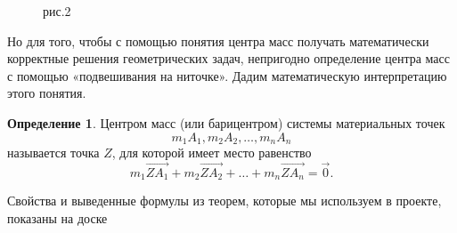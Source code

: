 \documentclass[a4paper,12pt]{article}
\theoremstyle{plain} %
\numberwithin{equation}{section}
\theoremstyle{definition} %
\newtheorem{defn}{Определение}[section]
\theoremstyle{remark} %
\begin{document}
\begin{figure}[h]
\begin{minipage}[h]{0.49\linewidth}
\end{minipage}
\hfill
\begin{minipage}[h]{0.49\linewidth}
\end{minipage}
\caption{рис.2}
\label{ris:image1}
\end{figure}
Но для того, чтобы с помощью понятия центра масс получать математически корректные решения геометрических задач, непригодно определение центра масс с помощью «подвешивания на ниточке». Дадим математическую интерпретацию этого понятия. 
\begin{defn}  Центром масс (или барицентром) системы материальных точек
\begin{equation}\label{syst} m_1 A_1,m_2 A_2,…,m_n A_n
\end{equation}
называется точка $Z$, для которой имеет место равенство 
\begin{equation}\label{s}
m_1 \overrightarrow{ZA_1}+m_2\overrightarrow{ZA_2}+\ldots+m_n \overrightarrow{ZA_n}=\overrightarrow{0}.
\end{equation}                 
\end{defn}
Свойства и выведенные формулы из теорем, которые мы используем в проекте, показаны на доске
\end{document}
